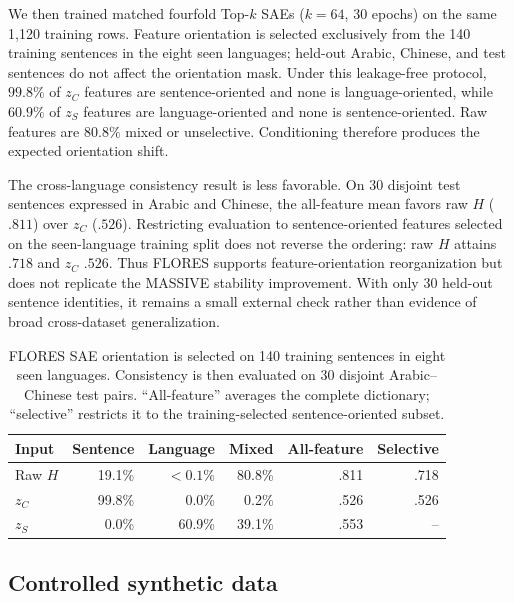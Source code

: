 \documentclass[11pt]{article}
\begin{document}
We then trained matched fourfold Top-$k$ SAEs ($k=64$, 30 epochs) on the same 1,120 training rows. Feature orientation is selected exclusively from the 140 training sentences in the eight seen languages; held-out Arabic, Chinese, and test sentences do not affect the orientation mask. Under this leakage-free protocol, $99.8\%$ of $z_C$ features are sentence-oriented and none is language-oriented, while $60.9\%$ of $z_S$ features are language-oriented and none is sentence-oriented. Raw features are $80.8\%$ mixed or unselective. Conditioning therefore produces the expected orientation shift.

The cross-language consistency result is less favorable. On 30 disjoint test sentences expressed in Arabic and Chinese, the all-feature mean favors raw $H$ ($.811$) over $z_C$ ($.526$). Restricting evaluation to sentence-oriented features selected on the seen-language training split does not reverse the ordering: raw $H$ attains $.718$ and $z_C$ $.526$. Thus FLORES supports feature-orientation reorganization but does not replicate the MASSIVE stability improvement. With only 30 held-out sentence identities, it remains a small external check rather than evidence of broad cross-dataset generalization.

\begin{table}[H]
\centering\scriptsize
\caption{FLORES SAE orientation is selected on 140 training sentences in eight seen languages. Consistency is then evaluated on 30 disjoint Arabic--Chinese test pairs. ``All-feature'' averages the complete dictionary; ``selective'' restricts it to the training-selected sentence-oriented subset.}
\label{tab:app-flores-sae}
\begin{tabular*}{\columnwidth}{@{\extracolsep{\fill}}lrrrrr@{}}
\toprule
Input & Sentence & Language & Mixed & All-feature & Selective \\
\midrule
Raw $H$ & 19.1\% & $<0.1\%$ & 80.8\% & .811 & .718 \\
$z_C$ & 99.8\% & 0.0\% & 0.2\% & .526 & .526 \\
$z_S$ & 0.0\% & 60.9\% & 39.1\% & .553 & -- \\
\bottomrule
\end{tabular*}
\end{table}

\subsection{Controlled synthetic data}
\end{document}
